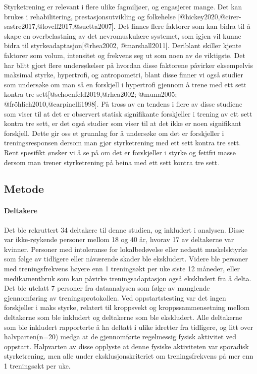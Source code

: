 \documentclass[
]{article}
\begin{document}
Styrketrening er relevant i flere ulike fagmiljøer, og engasjerer mange.
Det kan brukes i rehabilitering, prestasjonsutvikling og folkehelse
{[}@hickey2020,@cirer-sastre2017,@lovell2017,@suetta2007{]}. Det finnes
flere faktorer som kan bidra til å skape en overbelastning av det
nevromuskulære systemet, som igjen vil kunne bidra til
styrkeadaptasjon{[}@rhea2002, @marshall2011{]}. Deriblant skiller kjente
faktorer som volum, intensitet og frekvens seg ut som noen av de
viktigste. Det har blitt gjort flere undersøkelser på hvordan disse
faktorene påvirker eksempelvis maksimal styrke, hypertrofi, og
antropometri, blant disse finner vi også studier som undersøke om man så
en forskjell i hypertrofi gjennom å trene med ett sett kontra tre
sett{[}@schoenfeld2019,@rhea2002; @munn2005;
@fröhlich2010,@carpinelli1998{]}. På tross av en tendens i flere av
disse studiene som viser til at det er observert statisk signifikante
forskjeller i trening av ett sett kontra tre sett, er det også studier
som viser til at det ikke er noen signifikant forskjell. Dette gir oss
et grunnlag for å undersøke om det er forskjeller i treningsresponsen
dersom man gjør styrketrening med ett sett kontra tre sett. Rent
spesifikt ønsker vi å se på om det er forskjeller i styrke og fettfri
masse dersom man trener styrketrening på beina med ett sett kontra tre
sett.

\hypertarget{metode}{%
\subsection{Metode}\label{metode}}

\hypertarget{deltakere}{%
\paragraph{Deltakere}\label{deltakere}}

Det ble rekruttert 34 deltakere til denne studien, og inkludert i
analysen. Disse var ikke-røykende personer mellom 18 og 40 år, hvorav 17
av deltakerne var kvinner. Personer med intoleranse for lokalbedøvelse
eller nedsatt muskelsktyrke som følge av tidligere eller nåværende
skader ble ekskludert. Videre ble personer med treningsfrekvens høyere
enn 1 treningsøkt per uke siste 12 måneder, eller medikamentbruk som kan
påvirke treningsadaptasjon også ekskludert fra å delta. Det ble utelatt
7 personer fra dataanalysen som følge av manglende gjennomføring av
treningsprotokollen. Ved oppstartstesting var det ingen forskjeller i
maks styrke, relatert til kroppsvekt og kroppssammensetning mellom
deltakerne som ble inkludert og deltakerne som ble ekskludert. Alle
deltakerne som ble inkludert rapporterte å ha deltatt i ulike idretter
fra tidligere, og litt over halvparten(n=20) medga at de gjennomførte
regelmessig fysisk aktivitet ved oppstart. Halpvarten av disse opplyste
at denne fysiske aktiviteten var sporadisk styrketrening, men alle under
eksklusjonskriteriet om treningsfrekvens på mer enn 1 treningsøkt per
uke.
\end{document}
